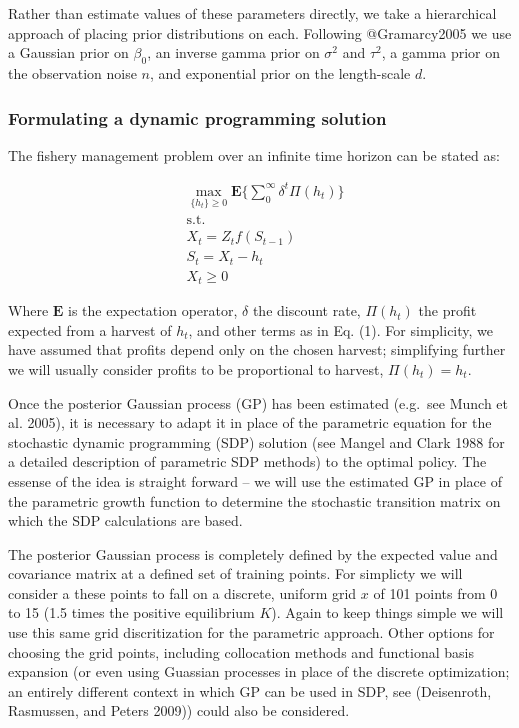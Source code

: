 \documentclass[author-year, review]{elsarticle} %
\begin{document}
Rather than estimate values of these parameters directly, we take a
hierarchical approach of placing prior distributions on each. Following
@Gramarcy2005 we use a Gaussian prior on $\beta_0$, an inverse gamma
prior on $\sigma^2$ and $\tau^2$, a gamma prior on the observation noise
$n$, and exponential prior on the length-scale $d$.

\subsubsection{Formulating a dynamic programming solution}

The fishery management problem over an infinite time horizon can be
stated as:

\begin{align}
& \max_{ \{h_t\} \geq 0 } \mathbf{E} \lbrace \sum_0^\infty \delta^t \Pi(h_t) \rbrace \\
& \mathrm{s.t.}  \\
 & X_t = Z_t f\left(S_{t-1}\right) \\
 & S_t = X_t - h_t \\
 & X_t  \geq 0 
\end{align}

Where $\mathbf{E}$ is the expectation operator, $\delta$ the discount
rate, $\Pi(h_t)$ the profit expected from a harvest of $h_t$, and other
terms as in Eq. (1). For simplicity, we have assumed that profits depend
only on the chosen harvest; simplifying further we will usually consider
profits to be proportional to harvest, $\Pi(h_t) = h_t$.

Once the posterior Gaussian process (GP) has been estimated (e.g.~see
Munch et al. 2005), it is necessary to adapt it in place of the
parametric equation for the stochastic dynamic programming (SDP)
solution (see Mangel and Clark 1988 for a detailed description of
parametric SDP methods) to the optimal policy. The essense of the idea
is straight forward -- we will use the estimated GP in place of the
parametric growth function to determine the stochastic transition matrix
on which the SDP calculations are based.

The posterior Gaussian process is completely defined by the expected
value and covariance matrix at a defined set of training points. For
simplicty we will consider a these points to fall on a discrete, uniform
grid $x$ of 101 points from 0 to 15 (1.5 times the positive equilibrium
$K$). Again to keep things simple we will use this same grid
discritization for the parametric approach. Other options for choosing
the grid points, including collocation methods and functional basis
expansion (or even using Guassian processes in place of the discrete
optimization; an entirely different context in which GP can be used in
SDP, see (Deisenroth, Rasmussen, and Peters 2009)) could also be
considered.
\end{document}
